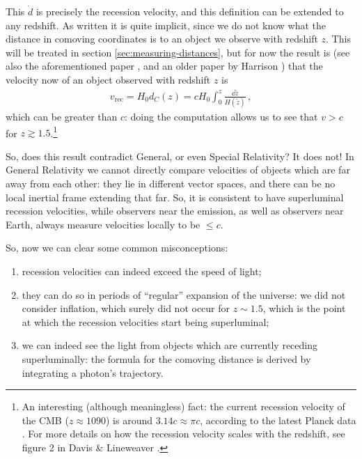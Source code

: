 \documentclass[main.tex]{subfiles}
\begin{document}
This \(\dot{d}\) is precisely the recession velocity, and this definition can be extended to any redshift. As written it is quite implicit, since we do not know what the distance in comoving coordinates is to an object we observe with redshift \(z\). This will be treated in section \ref{sec:measuring-distances}, but for now the result is (see also the aforementioned paper \cite[eq. 1]{davisExpandingConfusionCommon2004}, and an older paper by Harrison \cite[eq. 13]{harrisonRedshiftdistanceVelocitydistanceLaws1993}) that the velocity now of an object observed with redshift \(z\) is
%
\begin{align}
v _{\text{rec}} = H_0 d_C(z) = c H_0  \int_{0}^{z} \frac{ \dd{\widetilde{z}}}{H(\widetilde{z})}
\,,
\end{align}
%
which can be greater than \(c\): doing the computation allows us to see that \(v>c\) for \(z \gtrsim 1.5\).\footnote{An interesting (although meaningless) fact: the current recession velocity of the CMB (\(z \approx 1090\)) is around \(\num{3.14} c \approx \pi c\), according to the latest Planck data \cite[]{PlanckCollaboration:2016XIII}. For more details on how the recession velocity scales with the redshift, see figure 2 in Davis \& Lineweaver \cite[]{davisExpandingConfusionCommon2004}.} 

So, does this result contradict General, or even Special Relativity? 
It does not!
In General Relativity we cannot directly compare velocities of objects which are far away from each other: they lie in different vector spaces, and there can be no local inertial frame extending that far.
So, it is consistent to have superluminal recession velocities, while observers near the emission, as well as observers near Earth, always measure velocities locally to be \(\leq c\). 

So, now we can clear some common misconceptions: 
\begin{enumerate}
  \item recession velocities can indeed exceed the speed of light;
  \item they can do so in periods of ``regular'' expansion of the universe: we did not consider inflation, which surely did not occur for \(z \sim 1.5\), which is the point at which the recession velocities start being superluminal;
  \item we can indeed see the light from objects which are currently receding superluminally: the formula for the comoving distance is derived by integrating a photon's trajectory. 
\end{enumerate}
\end{document}

